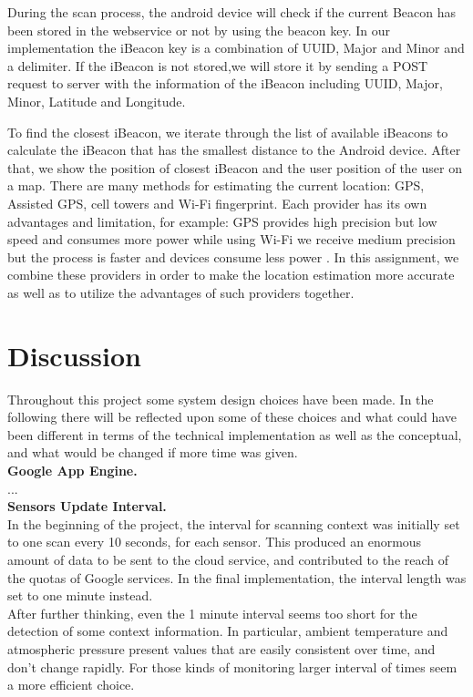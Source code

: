 \documentclass{sigchi}
\begin{document}
During the scan process, the android device will check if the current Beacon has been stored in the webservice or not by using the beacon key.
In our implementation the iBeacon key is a combination of UUID, Major and Minor and a delimiter.
If the iBeacon is not stored,we will store it by sending a POST request to server with the information of the iBeacon including UUID, Major, Minor, Latitude and Longitude.

To find the closest iBeacon, we iterate through the list of available iBeacons to calculate the iBeacon that has the smallest distance to the Android device. After that, we show the position of closest iBeacon and the user position of the user on a map.
There are many methods for estimating the current location: GPS, Assisted GPS, cell towers and Wi-Fi fingerprint.
Each provider has its own advantages and limitation, for example: GPS provides high precision but low speed and consumes more power while using Wi-Fi we receive medium precision but the process is faster and devices consume less power \cite{LaMarca:2008:LS, Constandache:2010:TMPLWWD}.
In this assignment, we combine these providers in order to make the location estimation more accurate as well as to utilize the advantages of such providers together. 
\section{Discussion}
Throughout this project some system design choices have
been made. In the following there will be reflected upon some of these choices and 
what could have been different in terms of the technical implementation
 as well as the conceptual, and what would be
changed if more time was given. \\

\textbf{Google App Engine. }\\
...\\

\textbf{Sensors Update Interval. } \\
In the beginning of the project, the interval for scanning context was initially set to one scan every 10 seconds, for each sensor. This produced an enormous amount of data to be sent to the cloud service, and contributed to the reach of the quotas of Google services.
In the final implementation, the interval length was set to one minute instead.\\ After further thinking, even the 1 minute interval seems too short for the detection of some context information. In particular, ambient temperature and atmospheric pressure present values that are easily consistent over time, and don't change rapidly. For those kinds of monitoring larger interval of times seem a more efficient choice.\\ 
\end{document}

